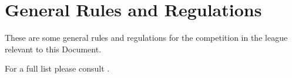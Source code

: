 \chapter{General Rules and Regulations}
\label{chap:rules}

These are some general rules and regulations for the competition in the \RoboCup\AtHome{} league relevant to this Document.

For a full list please consult \Rulebook.

%

%












%

